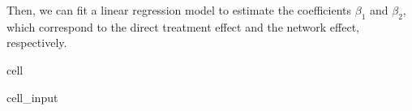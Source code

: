 \documentclass[letterpaper,10pt,english]{jupyterBook}
\begin{document}
\sphinxAtStartPar
Then, we can fit a linear regression model to estimate the coefficients \(\beta_1\) and \(\beta_2\), which correspond to the direct treatment effect and the network effect, respectively.

\begin{sphinxuseclass}{cell}\begin{sphinxVerbatimInput}

\begin{sphinxuseclass}{cell_input}
\begin{sphinxVerbatim}[commandchars=\\\{\}]
  \PYG{p}{[}  \PYG{p}{]}
    

   
\end{sphinxVerbatim}

\end{sphinxuseclass}\end{sphinxVerbatimInput}
\begin{sphinxVerbatimOutput}


\end{sphinxVerbatimOutput}
\end{sphinxuseclass}
\end{document}
